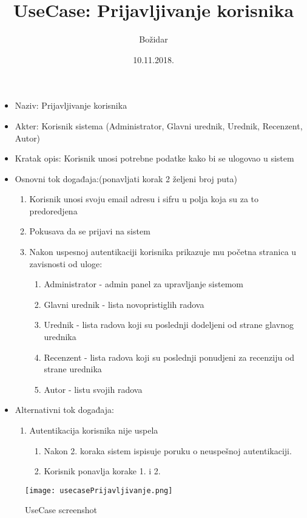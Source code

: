 \documentclass[a4paper]{article}
\title{UseCase: Prijavljivanje korisnika}
\date{10.11.2018.}
\author{Božidar}
\begin{document}
\maketitle

\begin{itemize}
    \item Naziv: Prijavljivanje korisnika
    \item Akter: Korisnik sistema (Administrator, Glavni urednik, Urednik, Recenzent, Autor)
    \item Kratak opis: Korisnik unosi potrebne podatke kako bi se ulogovao u sistem
    \item Osnovni tok događaja:(ponavljati korak 2 željeni broj puta)
        \begin{enumerate}
            \item Korisnik unosi svoju email adresu i sifru u polja koja su za to predoredjena
            \item Pokusava da se prijavi na sistem
            \item Nakon uspesnoj autentikaciji korisnika prikazuje mu početna stranica u zavisnosti od uloge:
            \begin{enumerate}
                \item Administrator - admin panel za upravljanje sistemom
                \item Glavni urednik - lista novopristiglih radova
                \item Urednik - lista radova koji su poslednji dodeljeni od strane glavnog urednika
                \item Recenzent - lista radova koji su poslednji ponudjeni za recenziju od strane urednika
                \item Autor - listu svojih radova
            \end{enumerate}
        \end{enumerate}
    \item Alternativni tok događaja:
        \begin{enumerate}
            \item Autentikacija korisnika nije uspela
                \begin{enumerate}
                    \item Nakon 2. koraka sistem ispisuje poruku o neuspešnoj autentikaciji.
                    \item Korisnik ponavlja korake 1. i 2.
                \end{enumerate}
        \end{enumerate}
\end{itemize}

\begin{figure}
    \centering
    \texttt{[image: usecasePrijavljivanje.png]}
    \caption{UseCase screenshot}
    \label{fig:my_label}
\end{figure}
\end{document}
